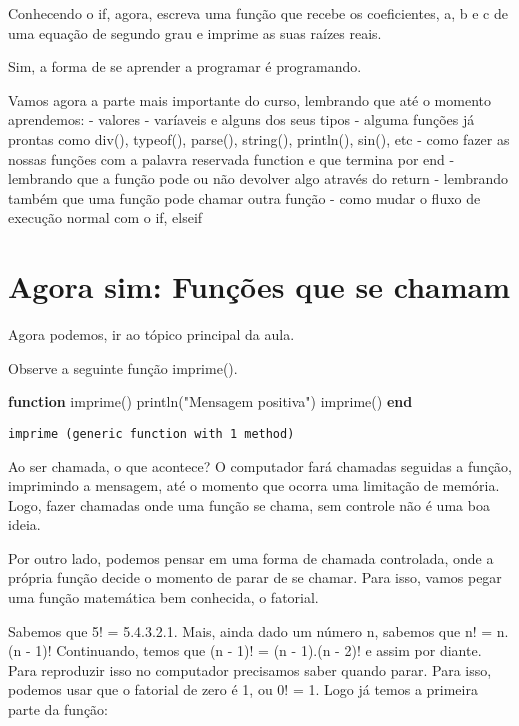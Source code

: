 \documentclass[
  letterpaper,
  DIV=11,
  numbers=noendperiod]{scrreprt}
\newenvironment{Shaded}{\begin{snugshade}}{\end{snugshade}}
\newcommand{\FunctionTok}[1]{\textcolor[rgb]{0.28,0.35,0.67}{#1}}
\newcommand{\KeywordTok}[1]{\textcolor[rgb]{0.00,0.23,0.31}{\textbf{#1}}}
\newcommand{\NormalTok}[1]{\textcolor[rgb]{0.00,0.23,0.31}{#1}}
\newcommand{\StringTok}[1]{\textcolor[rgb]{0.13,0.47,0.30}{#1}}
\begin{document}
Conhecendo o if, agora, escreva uma função que recebe os coeficientes,
a, b e c de uma equação de segundo grau e imprime as suas raízes reais.

Sim, a forma de se aprender a programar é programando.

Vamos agora a parte mais importante do curso, lembrando que até o
momento aprendemos: - valores - varíaveis e alguns dos seus tipos -
alguma funções já prontas como div(), typeof(), parse(), string(),
println(), sin(), etc - como fazer as nossas funções com a palavra
reservada function e que termina por end - lembrando que a função pode
ou não devolver algo através do return - lembrando também que uma função
pode chamar outra função - como mudar o fluxo de execução normal com o
if, elseif

\section{Agora sim: Funções que se
chamam}\label{agora-sim-funuxe7uxf5es-que-se-chamam}

Agora podemos, ir ao tópico principal da aula.

Observe a seguinte função imprime().

\begin{Shaded}
\begin{Highlighting}[]
\KeywordTok{function} \FunctionTok{imprime}\NormalTok{()}
    \FunctionTok{println}\NormalTok{(}\StringTok{"Mensagem positiva"}\NormalTok{)}
    \FunctionTok{imprime}\NormalTok{()}
\KeywordTok{end}
\end{Highlighting}
\end{Shaded}

\begin{verbatim}
imprime (generic function with 1 method)
\end{verbatim}

Ao ser chamada, o que acontece? O computador fará chamadas seguidas a
função, imprimindo a mensagem, até o momento que ocorra uma limitação de
memória. Logo, fazer chamadas onde uma função se chama, sem controle não
é uma boa ideia.

Por outro lado, podemos pensar em uma forma de chamada controlada, onde
a própria função decide o momento de parar de se chamar. Para isso,
vamos pegar uma função matemática bem conhecida, o fatorial.

Sabemos que 5! = 5.4.3.2.1. Mais, ainda dado um número n, sabemos que n!
= n.(n - 1)! Continuando, temos que (n - 1)! = (n - 1).(n - 2)! e assim
por diante. Para reproduzir isso no computador precisamos saber quando
parar. Para isso, podemos usar que o fatorial de zero é 1, ou 0! = 1.
Logo já temos a primeira parte da função:
\end{document}
